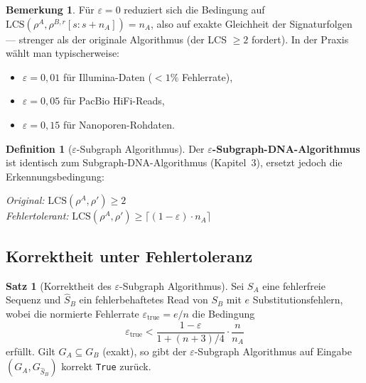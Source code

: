 ﻿\documentclass[a4paper,12pt]{article}
\theoremstyle{definition}
\newtheorem{definition}{Definition}
\newtheorem{satz}{Satz}
\newtheorem{bemerkung}{Bemerkung}
\begin{document}
\begin{bemerkung}
    F\"{u}r $\varepsilon = 0$ reduziert sich die Bedingung auf
    $\mathrm{LCS}(\rho^A, \rho^{B,r}[s:s+n_A]) = n_A$, also auf exakte
    Gleichheit der Signaturfolgen --- strenger als der originale
    Algorithmus (der LCS $\geq 2$ fordert). In der Praxis w\"{a}hlt man
    typischerweise:
    \begin{itemize}
        \item $\varepsilon = 0{,}01$ f\"{u}r Illumina-Daten ($< 1\%$ Fehlerrate),
        \item $\varepsilon = 0{,}05$ f\"{u}r PacBio HiFi-Reads,
        \item $\varepsilon = 0{,}15$ f\"{u}r Nanoporen-Rohdaten.
    \end{itemize}
\end{bemerkung}

\begin{definition}[$\varepsilon$-Subgraph Algorithmus]
    \label{def:fuzzy_algo}
    Der \textbf{$\varepsilon$-Subgraph-DNA-Algorithmus} ist identisch
    zum Subgraph-DNA-Algorithmus (Kapitel~3), ersetzt jedoch die
    Erkennungsbedingung:
    \begin{center}
        \emph{Original:} $\mathrm{LCS}(\rho^A, \rho') \geq 2$\\[4pt]
        \emph{Fehlertolerant:} $\mathrm{LCS}(\rho^A, \rho') \geq
        \lceil (1 - \varepsilon) \cdot n_A \rceil$
    \end{center}
\end{definition}

\subsection{Korrektheit unter Fehlertoleranz}

\begin{satz}[Korrektheit des \texorpdfstring{$\varepsilon$}{Îµ}-Subgraph Algorithmus]
    \label{satz:fuzzy_korrektheit}
    Sei $S_A$ eine fehlerfreie Sequenz und $\hat{S}_B$ ein fehlerbehaftetes
    Read von $S_B$ mit $e$ Substitutionsfehlern, wobei die normierte
    Fehlerrate $\varepsilon_{\mathrm{true}} = e/n$ die Bedingung
    \[
        \varepsilon_{\mathrm{true}} < \frac{1 - \varepsilon}{1 + (n+3)/4}
        \cdot \frac{n}{n_A}
    \]
    erf\"{u}llt.  Gilt $G_A \subseteq G_B$ (exakt), so gibt der
    $\varepsilon$-Subgraph Algorithmus auf Eingabe $(G_A, G_{\hat{S}_B})$
    korrekt \texttt{True} zur\"{u}ck.
\end{satz}
\end{document}

